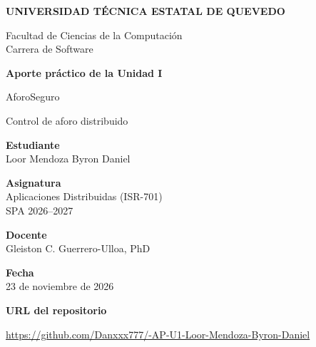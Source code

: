 \documentclass[11pt,a4paper]{article}
\begin{document}
\begin{center}
{\large\bfseries UNIVERSIDAD TÉCNICA ESTATAL DE QUEVEDO}\par
\vspace{7pt}
Facultad de Ciencias de la Computación\\
Carrera de Software\par
\vspace{2.2cm}
{\LARGE\bfseries Aporte práctico de la Unidad I}\par
\vspace{7pt}
{\Large AforoSeguro}\par
Control de aforo distribuido\par
\vspace{1.8cm}
\textbf{Estudiante}\\
Loor Mendoza Byron Daniel\par
\vspace{12pt}
\textbf{Asignatura}\\
Aplicaciones Distribuidas (ISR-701)\\
SPA 2026--2027\par
\vspace{12pt}
\textbf{Docente}\\
Gleiston C. Guerrero-Ulloa, PhD\par
\vspace{12pt}
\textbf{Fecha}\\
23 de noviembre de 2026\par
\vspace{1.5cm}
\textbf{URL del repositorio}\par
\vspace{5pt}
{\small\mbox{\url{https://github.com/Danxxx777/-AP-U1-Loor-Mendoza-Byron-Daniel}}}
\end{center}
\end{document}
